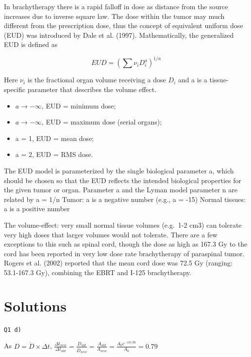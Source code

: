 \documentclass[]{book}
\providecommand{\tightlist}{%
  \setlength{\itemsep}{0pt}\setlength{\parskip}{0pt}}
\theoremstyle{definition}
\theoremstyle{definition}
\theoremstyle{definition}
\theoremstyle{remark}
\begin{document}
In brachytherapy there is a rapid falloff in dose as distance from the
source increases due to inverse square law. The dose within the tumor
may much different from the prescription dose, thus the concept of
equivalent uniform dose (EUD) was introduced by Dale et al. (1997).
Mathematically, the generalized EUD is defined as

\begin{equation*}
EUD= \left( \sum \nu_iD^a_i \right ) ^{1/a}
\end{equation*}

Here \(\nu_i\) is the fractional organ volume receiving a dose \(D_i\)
and a is a tissue-specific parameter that describes the volume effect.

\begin{itemize}
\tightlist
\item
  \(a \rightarrow -\infty\), EUD = minimum dose;
\item
  \(a \rightarrow -\infty\), EUD = maximum dose (serial organs);
\item
  a = 1, EUD = mean dose;
\item
  a = 2, EUD = RMS dose.
\end{itemize}

The EUD model is parameterized by the single biological parameter a,
which should be chosen so that the EUD reflects the intended biological
properties for the given tumor or organ. Parameter a and the Lyman model
parameter n are related by a = 1/n Tumor: a is a negative number (e.g.,
a = -15) Normal tissues: a is a positive number

The volume-effect: very small normal tissue volumes (e.g.~1-2 cm3) can
tolerate very high doses that larger volumes would not tolerate. There
are a few exceptions to this such as spinal cord, though the dose as
high as 167.3 Gy to the cord has been reported in very low dose rate
brachytherapy of paraspinal tumor. Rogers et al. (2002) reported that
the mean cord dose was 72.5 Gy (ranging: 53.1-167.3 Gy), combining the
EBRT and I-125 brachytherapy.

\section{Solutions}\label{ldr-solutions}

\texttt{Q1\ d)}

As \(D = \dot D\times\Delta t\),
\(\frac{\Delta t_{new}}{\Delta t_{old}}=\frac{\dot D_{old}}{\dot D_{new}} = \frac{A_{old}}{A_{new}} = \frac{A_0e^{-10/30}}{A_0} = 0.79\)
\end{document}
